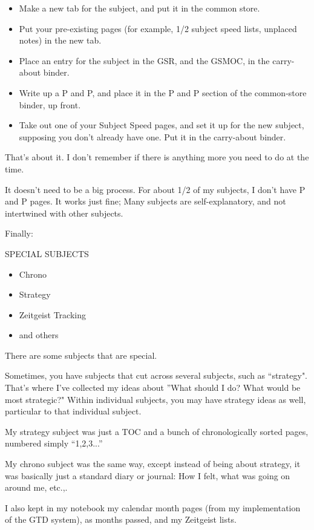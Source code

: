 \documentclass[oneside]{book}
\begin{document}
\begin{itemize}
\item Make a new tab for the subject, and put it in the common store.
\item Put your pre-existing pages (for example, 1/2 subject speed lists,
  unplaced notes) in the new tab.
\item Place an entry for the subject in the GSR, and the GSMOC, in the
  carry-about binder.
\item Write up a P and P, and place it in the P and P section of the common-store
  binder, up front.
\item Take out one of your Subject Speed pages, and set it up for the new
  subject, supposing you don't already have one. Put it in the
  carry-about binder.
\end{itemize}

That's about it. I don't remember if there is anything more you need
to do at the time.

It doesn't need to be a big process. For about 1/2 of my subjects, I
don't have P and P pages. It works just fine; Many subjects are
self-explanatory, and not intertwined with other subjects.

Finally:

SPECIAL SUBJECTS

\begin{itemize}
\item Chrono
\item Strategy
\item Zeitgeist Tracking
\item and others
\end{itemize}

There are some subjects that are special.

Sometimes, you have subjects that cut across several subjects, such as
``strategy". That's where I've collected my ideas about ''What should I
do? What would be most strategic?" Within individual subjects, you may
have strategy ideas as well, particular to that individual subject.

My strategy subject was just a TOC and a bunch of chronologically
sorted pages, numbered simply ``1,2,3...''

My chrono subject was the same way, except instead of being about
strategy, it was basically just a standard diary or journal: How I
felt, what was going on around me, etc.,.

I also kept in my notebook my calendar month pages (from my
implementation of the GTD system), as months passed, and my Zeitgeist
lists.
\end{document}
